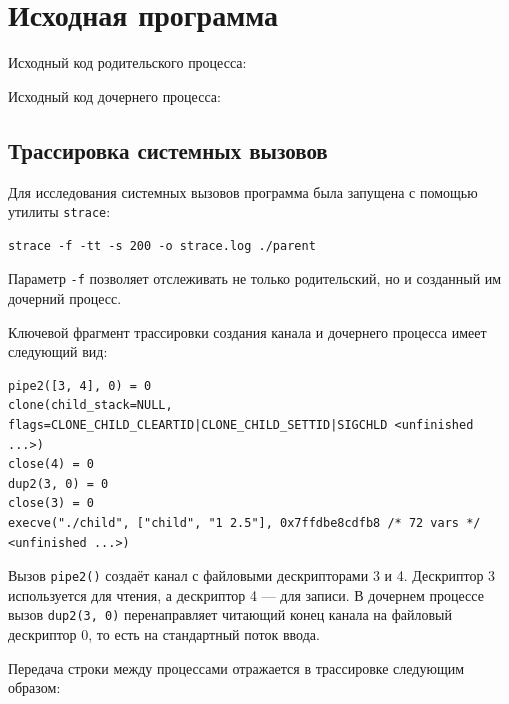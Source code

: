 \section{Исходная программа}

Исходный код родительского процесса:

\begin{center}

\end{center}

Исходный код дочернего процесса:

\begin{center}

\end{center}

\subsection{Трассировка системных вызовов}

Для исследования системных вызовов программа была запущена с помощью
утилиты \texttt{strace}:

\begin{lstlisting}
strace -f -tt -s 200 -o strace.log ./parent
\end{lstlisting}

Параметр \texttt{-f} позволяет отслеживать не только родительский,
но и созданный им дочерний процесс.

Ключевой фрагмент трассировки создания канала и дочернего процесса
имеет следующий вид:

\begin{lstlisting}
pipe2([3, 4], 0) = 0
clone(child_stack=NULL, flags=CLONE_CHILD_CLEARTID|CLONE_CHILD_SETTID|SIGCHLD <unfinished ...>)
close(4) = 0
dup2(3, 0) = 0
close(3) = 0
execve("./child", ["child", "1 2.5"], 0x7ffdbe8cdfb8 /* 72 vars */ <unfinished ...>)
\end{lstlisting}

Вызов \texttt{pipe2()} создаёт канал с файловыми дескрипторами 3
и 4. Дескриптор 3 используется для чтения, а дескриптор 4 ---
для записи. В дочернем процессе вызов \texttt{dup2(3, 0)}
перенаправляет читающий конец канала на файловый дескриптор 0,
то есть на стандартный поток ввода.

Передача строки между процессами отражается в трассировке следующим
образом:

